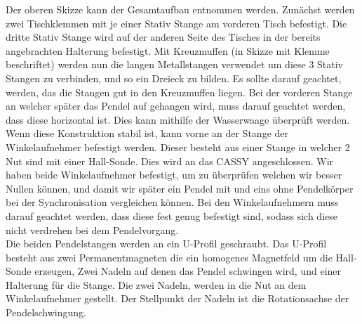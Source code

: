 \documentclass[twoside]{protokoll}
\begin{document}
Der oberen Skizze kann der Gesamtaufbau entnommen werden. 
Zunächst werden zwei Tischklemmen mit je einer Stativ Stange am vorderen Tisch befestigt.
Die dritte Stativ Stange wird auf der anderen Seite des Tisches in der bereits angebrachten Halterung befestigt. 
Mit Kreuzmuffen (in Skizze mit Klemme beschriftet) werden nun die langen Metallstangen verwendet um diese 3 Stativ Stangen zu verbinden, und so ein Dreieck zu bilden.
Es sollte darauf geachtet, werden, das die Stangen gut in den Kreuzmuffen liegen. 
Bei der vorderen Stange an welcher später das Pendel auf gehangen wird, muss darauf geachtet werden, dass diese horizontal ist.
Dies kann mithilfe der Wasserwaage überprüft werden.\\

Wenn diese Konstruktion stabil ist, kann vorne an der Stange der Winkelaufnehmer befestigt werden. 
Dieser besteht aus einer Stange in welcher 2 Nut sind mit einer Hall-Sonde. 
Dies wird an das CASSY angeschlossen.
Wir haben beide Winkelaufnehmer befestigt, um zu überprüfen welchen wir besser Nullen können, und damit wir später ein Pendel mit und eins ohne Pendelkörper bei der Synchronisation vergleichen können.
Bei den Winkelaufnehmern muss darauf geachtet werden, dass diese fest genug befestigt sind, sodass sich diese nicht verdrehen bei dem Pendelvorgang.\\

Die beiden Pendelstangen werden an ein U-Profil geschraubt.
Das U-Profil besteht aus zwei Permanentmagneten die ein homogenes Magnetfeld um die Hall-Sonde erzeugen, Zwei Nadeln auf denen das Pendel schwingen wird, und einer Halterung für die Stange. 
Die zwei Nadeln, werden in die Nut an dem Winkelaufnehmer gestellt.
Der Stellpunkt der Nadeln ist die Rotationsachse der Pendelschwingung. \\
\end{document}
